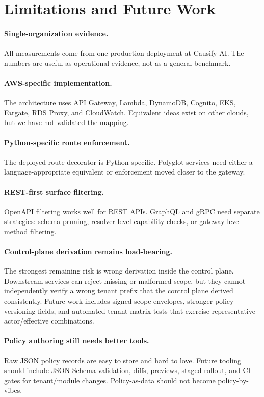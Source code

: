 \section{Limitations and Future Work}
\label{sec:limitations}

\paragraph{Single-organization evidence.}
All measurements come from one production deployment at Causify AI. The numbers are useful as operational evidence, not as a general benchmark.

\paragraph{AWS-specific implementation.}
The architecture uses API Gateway, Lambda, DynamoDB, Cognito, EKS, Fargate, RDS Proxy, and CloudWatch. Equivalent ideas exist on other clouds, but we have not validated the mapping.

\paragraph{Python-specific route enforcement.}
The deployed route decorator is Python-specific. Polyglot services need either a language-appropriate equivalent or enforcement moved closer to the gateway.

\paragraph{REST-first surface filtering.}
OpenAPI filtering works well for REST APIs. GraphQL and gRPC need separate strategies: schema pruning, resolver-level capability checks, or gateway-level method filtering.

\paragraph{Control-plane derivation remains load-bearing.}
The strongest remaining risk is wrong derivation inside the control plane. Downstream services can reject missing or malformed scope, but they cannot independently verify a wrong tenant prefix that the control plane derived consistently. Future work includes signed scope envelopes, stronger policy-versioning fields, and automated tenant-matrix tests that exercise representative actor/effective combinations.

\paragraph{Policy authoring still needs better tools.}
Raw JSON policy records are easy to store and hard to love. Future tooling should include JSON Schema validation, diffs, previews, staged rollout, and CI gates for tenant/module changes. Policy-as-data should not become policy-by-vibes.


